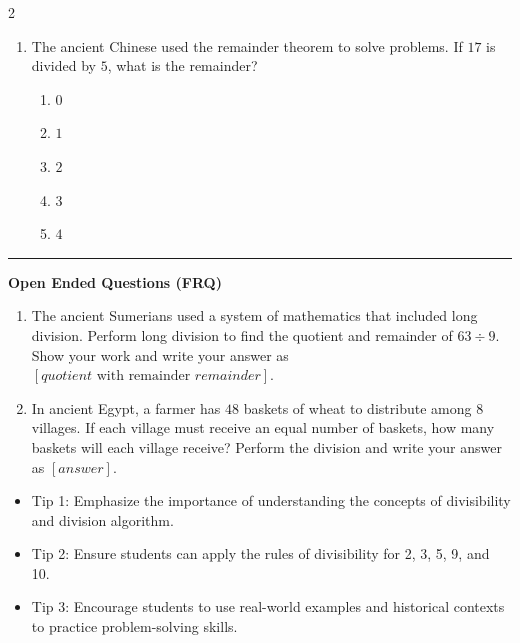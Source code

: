 \documentclass[10pt]{article}
\begin{document}
\begin{multicols}{2}
\begin{enumerate}[label=\textbf{Q\arabic*.}, leftmargin=*, itemsep=6pt, parsep=0pt]
  \item \small The ancient Chinese used the remainder theorem to solve problems. If $17$ is divided by $5$, what is the remainder?
  \begin{enumerate}[label=(\Alph*), leftmargin=0.6cm, nosep, itemsep=2pt]
    \item $0$
    \item $1$
    \item $2$
    \item $3$
    \item $4$
  \end{enumerate}

\end{enumerate}
\end{multicols}

\vspace{-0.2cm}
\hrule
\vspace{0.2cm}
\textbf{\small Open Ended Questions (FRQ)}
\begin{enumerate}[label=\textbf{Q\arabic*.}, start=9, itemsep=5pt, topsep=0pt]

  \item \small The ancient Sumerians used a system of mathematics that included long division. Perform long division to find the quotient and remainder of $63 \div 9$. Show your work and write your answer as $\boxed{[quotient \text{ with remainder } remainder]}$.  \vspace{2cm}

  \item \small In ancient Egypt, a farmer has $48$ baskets of wheat to distribute among $8$ villages. If each village must receive an equal number of baskets, how many baskets will each village receive? Perform the division and write your answer as $\boxed{[answer]}$.  \vspace{2cm}

\end{enumerate}

\vfill

\begin{tcolorbox}[colback=blue!5, colframe=mainblue!50, title=\small \textbf{Chef's Tips}, fonttitle=\bfseries, bottom=1mm]
\begin{itemize}[noitemsep, topsep=2pt, leftmargin=0.5cm]
  \item \scriptsize Tip 1: Emphasize the importance of understanding the concepts of divisibility and division algorithm.\item \scriptsize Tip 2: Ensure students can apply the rules of divisibility for 2, 3, 5, 9, and 10.\item \scriptsize Tip 3: Encourage students to use real-world examples and historical contexts to practice problem-solving skills.
\end{itemize}
\end{tcolorbox}
\end{document}
